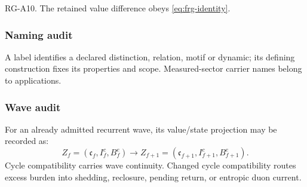 RG-A10. The retained value difference obeys \eqref{eq:frg-identity}.


\subsubsection{Naming audit}\label{subsec:naming-audit}
A label identifies a declared distinction, relation, motif or dynamic;
its defining construction fixes its properties and scope. Measured-sector
carrier names belong to applications.

\subsubsection{Wave audit}\label{subsec:wave-audit}
For an already admitted recurrent wave, its value/state projection may be recorded as:
\[
Z_f=(\mathfrak c_f,I^c_f,B^e_f)
\to
Z_{f+1}=(\mathfrak c_{f+1},I^c_{f+1},B^e_{f+1}).
\]
Cycle compatibility carries wave continuity. Changed cycle compatibility routes excess burden into shedding, reclosure, pending return, or entropic duon current.
